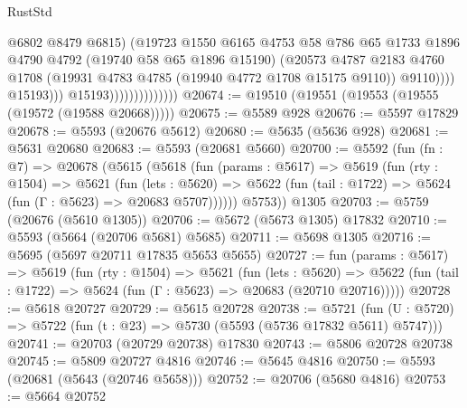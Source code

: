\begin{lexlean}{RustStd}
\begin{coremodule}
                                            @6802
                                            @8479
                                            @6815)
                                          (@19723
                                            @1550
                                            @6165
                                            @4753
                                            @58
                                            @786
                                            @65
                                            @1733
                                            @1896
                                            @4790
                                            @4792
                                            (@19740 @58 @65 @1896 @15190)
                                            (@20573
                                              @4787
                                              @2183
                                              @4760
                                              @1708
                                              (@19931 @4783 @4785 (@19940 @4772 @1708 @15175 @9110))
                                              @9110))))
                                      @15193)))
                                @15193))))))))))))))
@20674 := @19510 (@19551 (@19553 (@19555 (@19572 (@19588 @20668)))))
@20675 := @5589 @928
@20676 := @5597 @17829
@20678 := @5593 (@20676 @5612)
@20680 := @5635 (@5636 @928)
@20681 := @5631 @20680
@20683 := @5593 (@20681 @5660)
@20700 := @5592
    (fun (fn : @7) =>
    @20678
      (@5615
        (@5618
          (fun (params : @5617) =>
          @5619
            (fun (rty : @1504) =>
            @5621
              (fun (lets : @5620) =>
              @5622 (fun (tail : @1722) => @5624 (fun (Γ : @5623) => @20683 @5707))))))
        @5753))
    @1305
@20703 := @5759 (@20676 (@5610 @1305))
@20706 := @5672 (@5673 @1305) @17832
@20710 := @5593 (@5664 (@20706 @5681) @5685)
@20711 := @5698 @1305
@20716 := @5695 (@5697 @20711 @17835 @5653 @5655)
@20727 := fun (params : @5617) =>
  @5619
    (fun (rty : @1504) =>
    @5621
      (fun (lets : @5620) =>
      @5622 (fun (tail : @1722) => @5624 (fun (Γ : @5623) => @20683 (@20710 @20716)))))
@20728 := @5618 @20727
@20729 := @5615 @20728
@20738 := @5721
    (fun (U : @5720) => @5722 (fun (t : @23) => @5730 (@5593 (@5736 @17832 @5611) @5747)))
@20741 := @20703 (@20729 @20738) @17830
@20743 := @5806 @20728 @20738
@20745 := @5809 @20727 @4816
@20746 := @5645 @4816
@20750 := @5593 (@20681 (@5643 (@20746 @5658)))
@20752 := @20706 (@5680 @4816)
@20753 := @5664 @20752

\end{coremodule}
\end{lexlean}
